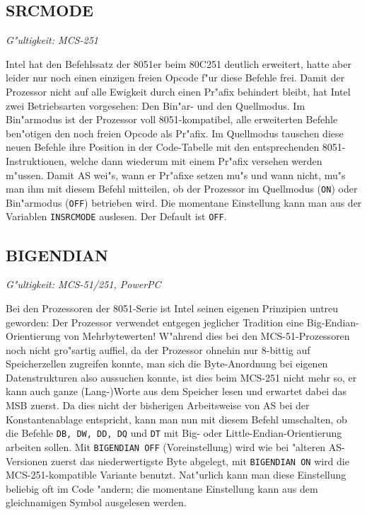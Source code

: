 \documentclass[12pt,a4paper,twoside]{report}
\makeatletter
\newcommand{\tty}[1]{{\tt #1}}
\newcommand{\ttindex}[1]{\index{#1@{\tt #1}}}
\makeatother
\begin{document}

\subsection{SRCMODE}
\ttindex{SRCMODE}

{\em G"ultigkeit: MCS-251}

Intel hat den Befehlssatz der 8051er beim 80C251 deutlich erweitert,
hatte aber leider nur noch einen einzigen freien Opcode f"ur diese
Befehle frei.  Damit der Prozessor nicht auf alle Ewigkeit durch
einen Pr"afix behindert bleibt, hat Intel zwei Betriebsarten vorgesehen:
Den Bin"ar- und den Quellmodus.  Im Bin"armodus ist der Prozessor voll
8051-kompatibel, alle erweiterten Befehle ben"otigen den noch freien
Opcode als Pr"afix.  Im Quellmodus tauschen diese neuen Befehle ihre
Position in der Code-Tabelle mit den entsprechenden 8051-Instruktionen,
welche dann wiederum mit einem Pr"afix versehen werden m"ussen.
Damit AS wei"s, wann er Pr"afixe setzen mu"s und wann nicht, mu"s man
ihm mit diesem Befehl mitteilen, ob der Prozessor im Quellmodus (\tty{ON})
oder Bin"armodus (\tty{OFF}) betrieben wird.  Die momentane Einstellung
kann man aus der Variablen \tty{INSRCMODE} auslesen.  Der Default ist
\tty{OFF}.


\subsection{BIGENDIAN}
\ttindex{BIGENDIAN}

{\em G"ultigkeit: MCS-51/251, PowerPC}

Bei den Prozessoren der 8051-Serie ist Intel seinen eigenen Prinzipien
untreu geworden: Der Prozessor verwendet entgegen jeglicher Tradition
eine Big-Endian-Orientierung von Mehrbytewerten!  W"ahrend dies bei
den MCS-51-Prozessoren noch nicht gro"sartig auffiel, da der Prozessor
ohnehin nur 8-bittig auf Speicherzellen zugreifen konnte, man sich die
Byte-Anordnung bei eigenen Datenstrukturen also aussuchen konnte, ist
dies beim MCS-251 nicht mehr so, er kann auch ganze (Lang-)Worte aus
dem Speicher lesen und erwartet dabei das MSB zuerst.  Da dies nicht der
bisherigen Arbeitsweise von AS bei der Konstantenablage entspricht,
kann man nun mit diesem Befehl umschalten, ob die Befehle \tty{DB, DW, DD,
DQ} und \tty{DT} mit Big- oder Little-Endian-Orientierung arbeiten sollen.
Mit \tty{BIGENDIAN OFF} (Voreinstellung) wird wie bei "alteren AS-Versionen
zuerst das niederwertigste Byte abgelegt, mit \tty{BIGENDIAN ON} wird die
MCS-251-kompatible Variante benutzt.  Nat"urlich kann man diese Einstellung
beliebig oft im Code "andern; die momentane Einstellung kann aus dem
gleichnamigen Symbol ausgelesen werden.
\end{document}
